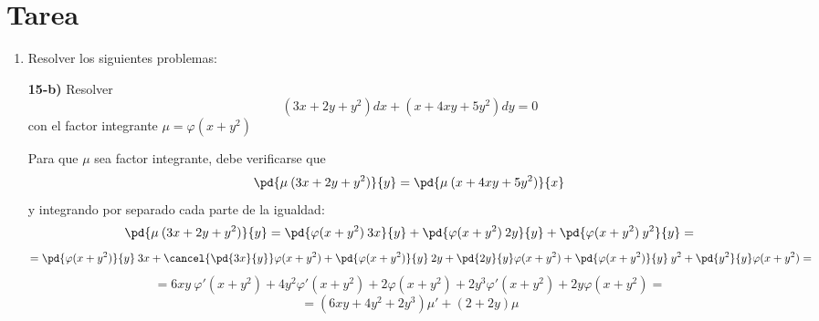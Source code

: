 \chapter{Tarea}
\justifying
\begin{enumerate}
    \item Resolver los siguientes problemas: 
    
    \textbf{15-b)} Resolver
    $$(3x+2y+y^2)dx+(x+4xy+5y^2)dy=0$$
    con el factor integrante $\mu = \varphi(x+y^2)$
    \begin{sol}
    Para que $\mu$ sea factor integrante, debe verificarse que
    $$\pd{\mu \: (3x+2y+y^2)}{y}=\pd{\mu \: (x+4xy+5y^2)}{x}$$
    y integrando por separado cada parte de la igualdad:
    $$\pd{\mu \: (3x+2y+y^2)}{y}=\pd{\varphi(x+y^2)\: 3x}{y}+ \pd{\varphi(x+y^2) \: 2y}{y}+\pd{\varphi(x+y^2) \: y^2}{y}=$$
    $$=\pd{\varphi(x+y^2)}{y}\: 3x +\cancel{\pd{3x}{y}}\varphi(x+y^2)+ \pd{\varphi(x+y^2)}{y} \: 2y + \pd{2y}{y} \varphi(x+y^2) + \pd{\varphi(x+y^2)}{y} \: y^2 + \pd{y^2}{y} \varphi(x+y^2) = $$
    $$= 6xy \:\varphi'(x+y^2) + 4y^2 \varphi'(x+y^2) + 2 \varphi(x+y^2) + 2y^3 \varphi'(x+y^2)+2y \varphi(x+y^2)=$$
    $$=(6xy+4y^2+2y^3)\mu'+(2+2y)\mu$$


\end{sol}
\end{enumerate}
